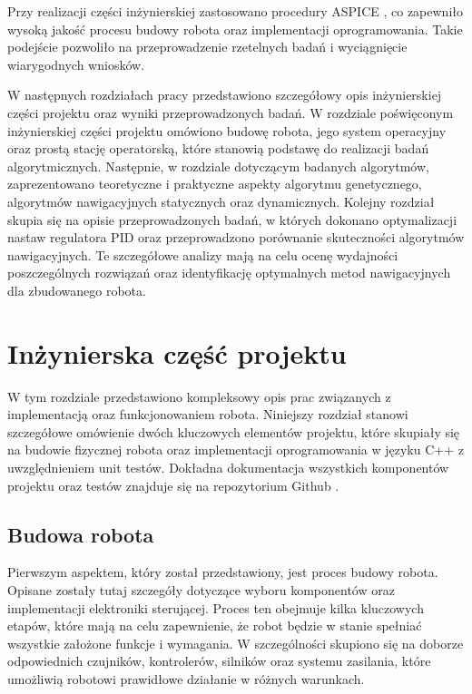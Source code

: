 \documentclass[12pt,twoside]{article}
\begin{document}
Przy realizacji części inżynierskiej zastosowano procedury ASPICE \cite{SPICE}, co  zapewniło wysoką jakość procesu budowy robota oraz implementacji oprogramowania. Takie podejście pozwoliło na przeprowadzenie rzetelnych badań i wyciągnięcie wiarygodnych wniosków.

W następnych rozdziałach pracy przedstawiono szczegółowy opis inżynierskiej części projektu oraz wyniki przeprowadzonych badań. W rozdziale poświęconym inżynierskiej części projektu omówiono budowę robota, jego system operacyjny oraz prostą stację operatorską, które stanowią podstawę do realizacji badań algorytmicznych. Następnie, w rozdziale dotyczącym badanych algorytmów, zaprezentowano teoretyczne i praktyczne aspekty algorytmu genetycznego, algorytmów nawigacyjnych statycznych oraz dynamicznych. Kolejny rozdział skupia się na opisie przeprowadzonych badań, w których dokonano optymalizacji nastaw regulatora PID oraz przeprowadzono porównanie skuteczności algorytmów nawigacyjnych. Te szczegółowe analizy mają na celu ocenę wydajności poszczególnych rozwiązań oraz identyfikację optymalnych metod nawigacyjnych dla zbudowanego robota.

\section{Inżynierska część projektu}

W tym rozdziale przedstawiono kompleksowy opis prac związanych z implementacją oraz funkcjonowaniem robota. Niniejszy rozdział stanowi szczegółowe omówienie dwóch kluczowych elementów projektu, które skupiały się na budowie fizycznej robota oraz implementacji oprogramowania w języku C++ z uwzględnieniem unit testów.
Dokładna dokumentacja wszystkich komponentów projektu oraz testów znajduje się na repozytorium Github \cite{repo}.

\subsection{Budowa robota}

Pierwszym aspektem, który został przedstawiony, jest proces budowy robota. Opisane zostały tutaj szczegóły dotyczące wyboru komponentów oraz implementacji elektroniki sterującej. Proces ten obejmuje kilka kluczowych etapów, które mają na celu zapewnienie, że robot będzie w stanie spełniać wszystkie założone funkcje i wymagania. W szczególności skupiono się na doborze odpowiednich czujników, kontrolerów, silników oraz systemu zasilania, które umożliwią robotowi prawidłowe działanie w różnych warunkach.
\end{document}
